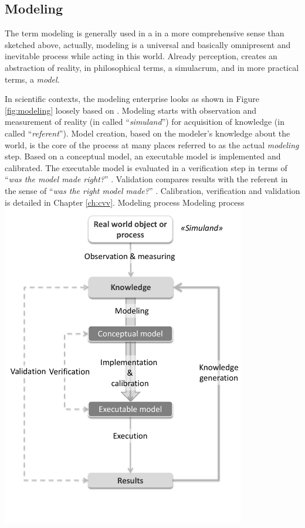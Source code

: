 
\subsection{Modeling}
\label{sec:alittletheory_modeling}
The term modeling is generally used in a in a more comprehensive sense than sketched above, actually, modeling is a universal and basically omnipresent and inevitable process while acting in this world. Already perception, creates an abstraction of reality, in philosophical terms, a simulacrum, and in more practical terms, a \emph{model}. 

In scientific contexts, the modeling enterprise looks as shown in Figure \ref{fig:modeling} loosely based on \citet[][Figure 10.2]{Petty_SokolowskiBanks_2010}. Modeling starts with observation and measurement of reality (in \citet[][]{Petty_SokolowskiBanks_2010} called ``\emph{simuland}'') for acquisition of knowledge (in \citet[][]{Petty_SokolowskiBanks_2010} called ``\emph{referent}''). Model creation, based on the modeler's knowledge about the world, is the core of the process at many places referred to as the actual \emph{modeling} step. Based on a conceptual model, an executable model is implemented and calibrated. The executable model is evaluated in a verification step in terms of ``\emph{was the model made right?}'' \citet[][p.332]{Petty_SokolowskiBanks_2010}. Validation compares results with the referent in the sense of ``\emph{was the right model made?}'' \citet[][p.332]{Petty_SokolowskiBanks_2010}. Calibration, verification and validation is detailed in Chapter \ref{ch:cvv}.
%
\createfigure%
{Modeling process}%
{Modeling process}%
{\label{fig:modeling}}%
{\includegraphics[width=0.8\textwidth,angle=0]{figures/modeling.pdf}}%
{}

